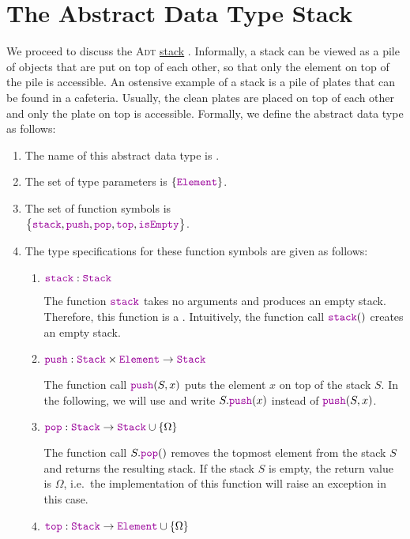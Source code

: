 \section{The Abstract Data Type Stack}
We proceed to discuss the \textsc{Adt} \href{https://en.wikipedia.org/wiki/Stack_(abstract_data_type)}{stack} 
. 
Informally, a stack can be viewed as a pile of objects that are put on top of each other, so that
only the element on top of the pile is accessible.  An ostensive example of a stack is a pile of
plates that can be found in a cafeteria.  Usually, the clean plates are placed on top of each other
and only the plate on top is accessible.  Formally, we define the abstract data type
 as follows: 
\begin{enumerate}
\item The name of this abstract data type is .
\item The set of type parameters is $\{ \mytt{Element} \}$.
\item The set of function symbols is \\[0.2cm]
      \hspace*{1.3cm} 
      $\bigl\{ \mytt{stack}, \mytt{push}, \mytt{pop}, \mytt{top}, \mytt{isEmpty} \bigr\}$.
\item The type specifications for these function symbols are given as follows:
      \begin{enumerate}
      \item $\mytt{stack}: \mytt{Stack}$

            The function $\mytt{stack}$ takes no arguments and produces an empty stack.
            Therefore, this function is a .  Intuitively, the function call $\mytt{stack}()$ 
            creates an empty stack.
      \item $\mytt{push}: \mytt{Stack} \times \mytt{Element} \rightarrow \mytt{Stack}$

            The function call $\mytt{push}(S,x)$ puts the element $x$ on top of the stack $S$.  In
            the following, we will use 
            and write $S.\mytt{push}(x)$ instead of $\mytt{push}(S,x)$.
      \item $\mytt{pop}: \mytt{Stack}  \rightarrow \mytt{Stack} \cup \{ \Omega \}$

            The function call $S.\mytt{pop}()$ removes the topmost element from the stack $S$ and returns the
            resulting stack.  If the stack $S$ is empty, the return value is $\Omega$, i.e.~the implementation
            of this function will raise an exception in this case.
      \item $\mytt{top}: \mytt{Stack} \rightarrow \mytt{Element} \cup \{ \Omega \}$


\end{enumerate}
\end{enumerate}
